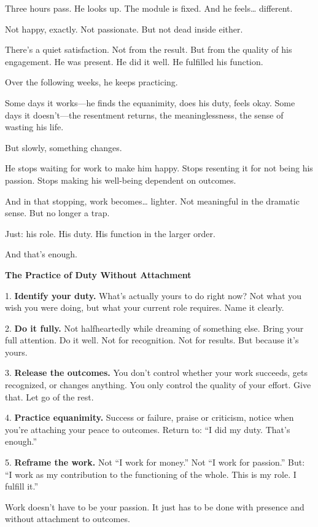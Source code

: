 \documentclass[11pt,twoside]{book}
\begin{document}
Three hours pass. He looks up. The module is fixed. And he feels\ldots{} different.

Not happy, exactly. Not passionate. But not dead inside either.

There's a quiet satisfaction. Not from the result. But from the quality of his engagement. He was present. He did it well. He fulfilled his function.

Over the following weeks, he keeps practicing.

Some days it works—he finds the equanimity, does his duty, feels okay. Some days it doesn't—the resentment returns, the meaninglessness, the sense of wasting his life.

But slowly, something changes.

He stops waiting for work to make him happy. Stops resenting it for not being his passion. Stops making his well-being dependent on outcomes.

And in that stopping, work becomes\ldots{} lighter. Not meaningful in the dramatic sense. But no longer a trap.

Just: his role. His duty. His function in the larger order.

And that's enough.

\begin{practicebox}
\textbf{The Practice of Duty Without Attachment}

1. \textbf{Identify your duty.} What's actually yours to do right now? Not what you wish you were doing, but what your current role requires. Name it clearly.

2. \textbf{Do it fully.} Not halfheartedly while dreaming of something else. Bring your full attention. Do it well. Not for recognition. Not for results. But because it's yours.

3. \textbf{Release the outcomes.} You don't control whether your work succeeds, gets recognized, or changes anything. You only control the quality of your effort. Give that. Let go of the rest.

4. \textbf{Practice equanimity.} Success or failure, praise or criticism, notice when you're attaching your peace to outcomes. Return to: ``I did my duty. That's enough.''

5. \textbf{Reframe the work.} Not ``I work for money.'' Not ``I work for passion.'' But: ``I work as my contribution to the functioning of the whole. This is my role. I fulfill it.''

Work doesn't have to be your passion. It just has to be done with presence and without attachment to outcomes.
\end{practicebox}
\end{document}
